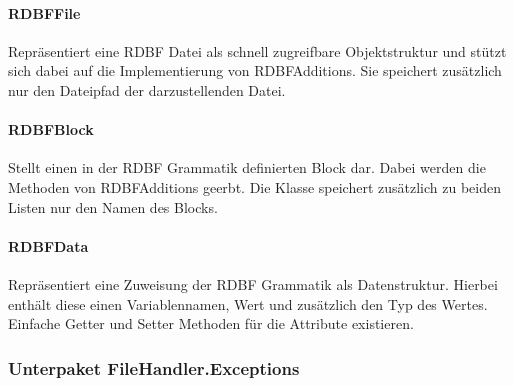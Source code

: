 \documentclass[parskip=full]{scrartcl}
\begin{document}
\paragraph{RDBFFile}
Repräsentiert eine RDBF Datei als schnell zugreifbare Objektstruktur und stützt sich dabei auf die Implementierung von RDBFAdditions.
Sie speichert zusätzlich nur den Dateipfad der darzustellenden Datei.
\paragraph{RDBFBlock}
Stellt einen in der RDBF Grammatik definierten Block dar. Dabei werden die Methoden von RDBFAdditions geerbt.
Die Klasse speichert zusätzlich zu beiden Listen nur den Namen des Blocks.
\paragraph{RDBFData}
Repräsentiert eine Zuweisung der RDBF Grammatik als Datenstruktur. Hierbei enthält diese einen Variablennamen, Wert und zusätzlich den Typ des Wertes.
Einfache Getter und Setter Methoden für die Attribute existieren.
\subsubsection{Unterpaket FileHandler.Exceptions}
\end{document}
